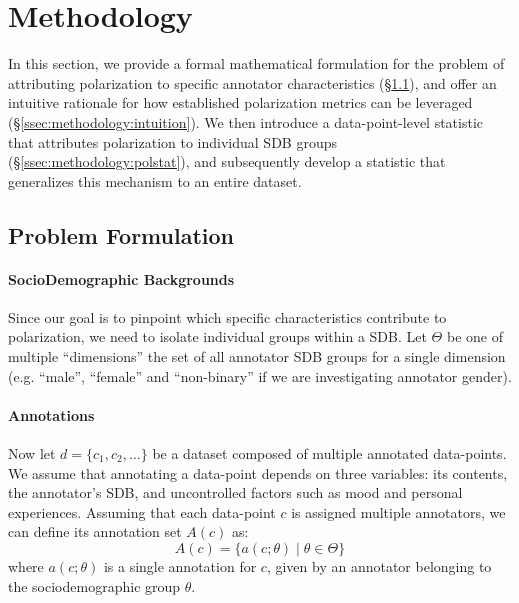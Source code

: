 \documentclass{article}
\begin{document}
\section{Methodology}
\label{sec:methodology}

In this section, we provide a formal mathematical formulation for the problem of attributing polarization to specific annotator characteristics (\S\ref{ssec:methodology:problem}), and offer an intuitive rationale for how established polarization metrics can be leveraged (\S\ref{ssec:methodology:intuition}). We then introduce a data-point-level statistic that attributes polarization to individual \ac{SDB} groups (\S\ref{ssec:methodology:polstat}), and subsequently develop a statistic that generalizes this mechanism to an entire dataset.


\subsection{Problem Formulation}
\label{ssec:methodology:problem}

\paragraph{SocioDemographic Backgrounds }Since our goal is to pinpoint which specific characteristics contribute to polarization, we need to isolate individual groups within a \ac{SDB}. Let $\Theta$ be one of multiple ``dimensions'' the set of all annotator \ac{SDB} groups for a single dimension (e.g. ``male'', ``female'' and ``non-binary'' if we are investigating annotator gender).

\paragraph{Annotations} Now let $d = \{c_1, c_2, \ldots\}$ be a dataset composed of multiple annotated data-points. We assume that annotating a data-point depends on three variables: its contents, the annotator's \ac{SDB}, and uncontrolled factors such as mood and personal experiences. Assuming that each data-point $c$ is assigned multiple annotators, we can define its annotation set $A(c)$ as:
\begin{equation}
    A(c) = \{a(c; \theta) \mid \theta \in \Theta \}
\end{equation}
\noindent where  $a(c; \theta)$ is a single annotation for $c$, given by an annotator belonging to the sociodemographic group $\theta$.
\end{document}
